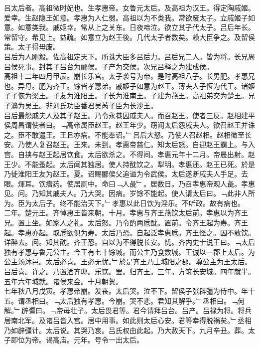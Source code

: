 \documentclass{zhvt-classic}
\begin{document}
\hspace*{2em}吕太后者。高祖微时妃也。生孝惠帝。女鲁元太后。及高祖为汉王。得定陶戚姬。爱幸。生赵隐王如意。孝惠为人仁弱。高祖以为不类我。常欲废太子。立戚姬子如意。如意类我。戚姬幸。常从上之关东。日夜啼泣。欲立其子代太子。吕后年长。常留守。希见上。益疏。如意立为赵王後。几代太子者数矣。赖大臣争之。及留侯策。太子得毋废。\\
\hspace*{2em}吕后为人刚毅。佐高祖定天下。所诛大臣多吕后力。吕后兄二人。皆为将。长兄周吕侯死事。封其子吕台为郦侯。子产为交侯。次兄吕释之为建成侯。\\
\hspace*{2em}高祖十二年四月甲辰。崩长乐宫。太子袭号为帝。是时高祖八子。长男肥。孝惠兄也。异母。肥为齐王。馀皆孝惠弟。戚姬子如意为赵王。薄夫人子恆为代王。诸姬子子恢为梁王。子友为淮阳王。子长为淮南王。子建为燕王。高祖弟交为楚王。兄子濞为吴王。非刘氏功臣番君吴芮子臣为长沙王。\\
\hspace*{2em}吕后最怨戚夫人及其子赵王。乃令永巷囚戚夫人。而召赵王。使者三反。赵相建平侯周昌谓使者曰。﹁高帝属臣赵王。赵王年少。窃闻太后怨戚夫人。欲召赵王并诛之。臣不敢遣王。王且亦病。不能奉诏。﹂吕后大怒。乃使人召赵相。赵相徵至长安。乃使人复召赵王。王来。未到。孝惠帝慈仁。知太后怒。自迎赵王霸上。与入宫。自挟与赵王起居饮食。太后欲杀之。不得间。孝惠元年十二月。帝晨出射。赵王少。不能蚤起。太后闻其独居。使人持酖饮之。犁明。孝惠还。赵王已死。於是乃徙淮阳王友为赵王。夏。诏赐郦侯父追谥为令武侯。太后遂断戚夫人手足。去眼。煇耳。饮瘖药。使居厕中。命曰﹁人彘﹂。居数日。乃召孝惠帝观人彘。孝惠见。问。乃知其戚夫人。乃大哭。因病。岁馀不能起。使人请太后曰。﹁此非人所为。臣为太后子。终不能治天下。﹂孝惠以此日饮为淫乐。不听政。故有病也。\\
\hspace*{2em}二年。楚元王。齐悼惠王皆来朝。十月。孝惠与齐王燕饮太后前。孝惠以为齐王兄。置上坐。如家人之礼。太后怒。乃令酌两卮酖。置前。令齐王起为寿。齐王起。孝惠亦起。取卮欲俱为寿。太后乃恐。自起泛孝惠卮。齐王怪之。因不敢饮。详醉去。问。知其酖。齐王恐。自以为不得脱长安。忧。齐内史士说王曰。﹁太后独有孝惠与鲁元公主。今王有七十馀城。而公主乃食数城。王诚以一郡上太后。为公主汤沐邑。太后必喜。王必无忧。﹂於是齐王乃上城阳之郡。尊公主为王太后。吕后喜。许之。乃置酒齐邸。乐饮。罢。归齐王。三年。方筑长安城。四年就半。五年六年城就。诸侯来会。十月朝贺。\\
\hspace*{2em}七年秋八月戊寅。孝惠帝崩。发丧。太后哭。泣不下。留侯子张辟彊为侍中。年十五。谓丞相曰。﹁太后独有孝惠。今崩。哭不悲。君知其解乎。﹂丞相曰。﹁何解。﹂辟彊曰。﹁帝毋壮子。太后畏君等。君今请拜吕台。吕产。吕禄为将。将兵居南北军。及诸吕皆入宫。居中用事。如此则太后心安。君等幸得脱祸矣。﹂丞相乃如辟彊计。太后说。其哭乃哀。吕氏权由此起。乃大赦天下。九月辛丑。葬。太子即位为帝。谒高庙。元年。号令一出太后。\\
\end{document}
